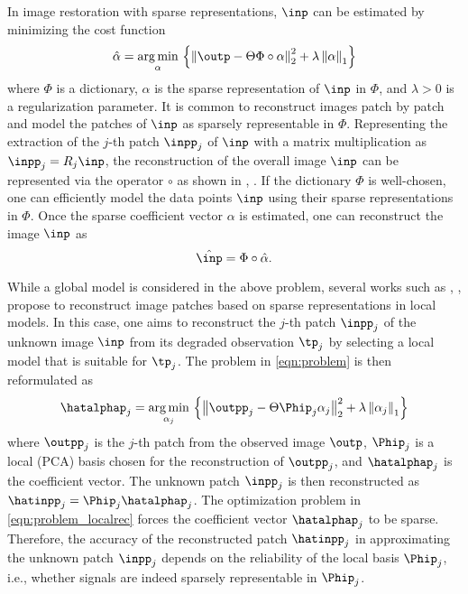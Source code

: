 \documentclass[journal]{IEEEtran}
\begin{document}
In image restoration with sparse representations, $\inp$ can be estimated by minimizing the cost function 
%
\begin{equation}
	\label{eqn:problem}
	\hat \alpha=\underset{\alpha}{\operatorname{arg\,min}} \, \left\{ \left\| \outp -\Theta\Phi\circ\alpha\right\|_{2}^{2} + \lambda \left\| \alpha \right\|_1\right\}
\end{equation}
%
where $\Phi$ is a  dictionary, $\alpha$ is the sparse representation of $\inp$ in $\Phi$, and $\lambda>0$ is a regularization parameter. It is common to reconstruct images patch by patch and model the patches of $\inp$ as sparsely representable in $\Phi$. Representing the extraction of the $j$-th patch $\inpp_j$ of $\inp$ with a matrix multiplication as $\inpp_j = R_j \inp$, the reconstruction of the overall image $\inp$ can be represented via the operator $\circ$ as shown in \cite{Dong13nonlocally}, \cite{Dong11image}.  If the dictionary $\Phi$ is well-chosen, one can efficiently model the data points $\inp$ using their sparse representations in $\Phi$. Once the sparse coefficient vector $\alpha$ is estimated, one can reconstruct the image $\inp$ as 
\begin{equation}
	\label{eqn:reconstruct}
	\hat{\inp} = \Phi\circ \hat\alpha . %
\end{equation}

While a global model is considered in the above problem, several works such as \cite{Dong13nonlocally}, \cite{Dong11image}, \cite{Yu12solving} propose to reconstruct image patches based on sparse representations in local models. In this case, one aims to reconstruct the $j$-th patch $\inpp_j$ of the unknown image $\inp$ from its degraded observation $\tp_j$ by selecting a local model that is suitable for $\tp_j$. The problem in \eqref{eqn:problem} is then reformulated as
%
\begin{equation}
	\label{eqn:problem_localrec}
	\hatalphap_j=\underset{\alpha_j}{\operatorname{arg\,min}} \, \left\{ \left\|  \outpp_j -\Theta \Phip_j \alpha_j \right\|_{2}^{2} + \lambda \left\| \alpha_j \right\|_1\right\}
\end{equation}
%
where $\outpp_j$ is the $j$-th patch from the observed image $\outp$, $\Phip_j$ is a local (PCA) basis chosen for the reconstruction of $\outpp_j$, and $\hatalphap_j$ is the coefficient vector. The unknown patch $\inpp_j$ is then reconstructed as $\hatinpp_j= \Phip_j \hatalphap_j$. The optimization problem in \eqref{eqn:problem_localrec} forces the coefficient vector $\hatalphap_j$ to be sparse. Therefore, the accuracy of the reconstructed patch $\hatinpp_j$ in approximating the unknown patch $\inpp_j$ depends on the reliability of the local basis $\Phip_j$, i.e., whether signals are indeed sparsely representable in $\Phip_j$. 
\end{document}
